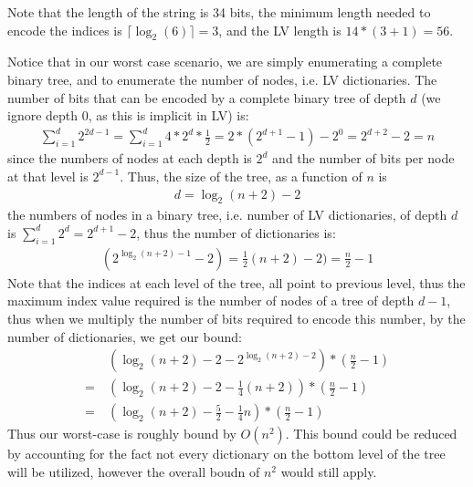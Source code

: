 Note that the length of the string is 34 bits, the minimum length needed to encode the indices is $\lceil \log_2(6) \rceil = 3$, and the LV length is $14*(3+1) = 56$.

Notice that in our worst case scenario, we are simply enumerating a complete binary tree, and to enumerate the number of nodes, i.e. LV dictionaries.  The number of bits that can be encoded by a complete binary tree of depth $d$ (we ignore depth 0, as this is implicit in LV) is:
\begin{align*}
\sum_{i=1}^{d}2^{2d-1} = \sum_{i=1}^{d}4*2^{d}*\frac{1}{2} = 2*(2^{d+1} - 1) - 2^{0} = 2^{d+2} - 2 = n
\end{align*}
since the numbers of nodes at each depth is $2^d$ and the number of bits per node at that level is $2^{d-1}$.  Thus, the size of the tree, as a function of $n$ is 
\begin{align*}
 d = \log_2(n +2) - 2
\end{align*}
the numbers of nodes in a binary tree, i.e. number of LV dictionaries, of depth $d$ is $\sum_{i=1}^{d}2^{d} =  2^{d+1} - 2$, thus the number of dictionaries is:
\begin{align*}
 (2^{\log_2(n +2) - 1} - 2) = \frac{1}{2}(n + 2) - 2) = \frac{n}{2} -1
\end{align*}
Note that the indices at each level of the tree, all point to previous level, thus the maximum index value required is the number of nodes of a tree of depth $d-1$, thus when we multiply the number of bits required to encode this number, by the number of dictionaries, we get our bound:
\begin{align*}
&(\log_2(n +2) - 2 - 2^{\log_2(n +2) - 2})*(\frac{n}{2} -1)\\
=~& (\log_2(n +2) - 2 - \frac{1}{4}(n +2))*(\frac{n}{2} -1)\\
=~& (\log_2(n +2) - \frac{5}{2} - \frac{1}{4}n)*(\frac{n}{2} -1)
\end{align*}
Thus our worst-case is roughly bound by $O(n^2)$.  This bound could be reduced by accounting for the fact not every dictionary on the bottom level of the tree will be utilized, however the overall boudn of $n^2$ would still apply.